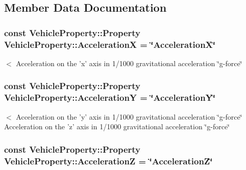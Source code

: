 \subsection{Member Data Documentation}
\hypertarget{classVehicleProperty_a94eac12d319850190e9ece93690517f7}{
\subsubsection[{Acceleration\-X}]{\setlength{\rightskip}{0pt plus 5cm}const Vehicle\-Property\-::\-Property Vehicle\-Property\-::\-Acceleration\-X = \char`\"{}Acceleration\-X\char`\"{}\hspace{0.3cm}{\ttfamily [static]}}}\label{classVehicleProperty_a94eac12d319850190e9ece93690517f7}
$<$ Acceleration on the 'x' axis in 1/1000 gravitational acceleration \char`\"{}g-\/force\char`\"{} \hypertarget{classVehicleProperty_af56803eeb7710aeae2954f4cd9b66cf6}{
\subsubsection[{Acceleration\-Y}]{\setlength{\rightskip}{0pt plus 5cm}const Vehicle\-Property\-::\-Property Vehicle\-Property\-::\-Acceleration\-Y = \char`\"{}Acceleration\-Y\char`\"{}\hspace{0.3cm}{\ttfamily [static]}}}\label{classVehicleProperty_af56803eeb7710aeae2954f4cd9b66cf6}
$<$ Acceleration on the 'y' axis in 1/1000 gravitational acceleration \char`\"{}g-\/force\char`\"{} Acceleration on the 'z' axis in 1/1000 gravitational acceleration \char`\"{}g-\/force\char`\"{} \hypertarget{classVehicleProperty_a1ce0b3be3a09d5a96741890d0d67496f}{
\subsubsection[{Acceleration\-Z}]{\setlength{\rightskip}{0pt plus 5cm}const Vehicle\-Property\-::\-Property Vehicle\-Property\-::\-Acceleration\-Z = \char`\"{}Acceleration\-Z\char`\"{}\hspace{0.3cm}{\ttfamily [static]}}}\label{classVehicleProperty_a1ce0b3be3a09d5a96741890d0d67496f}
